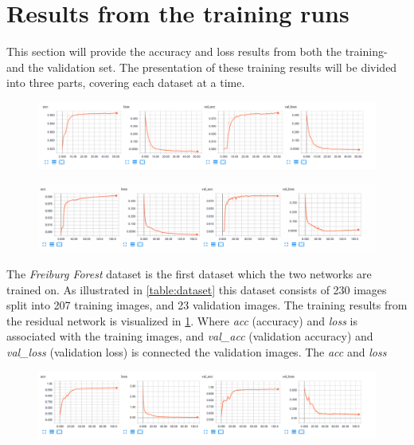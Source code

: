 \documentclass[USenglish]{ifimaster}  %
\begin{document}
\section{Results from the training runs}
This section will provide the accuracy and loss results from both the training- and the validation set. The presentation of these training results will be divided into three parts, covering each dataset at a time. 
\begin{figure}[ht]
    \centering
    \includegraphics[width=1.1\textwidth]{bilder/freiburg_residual_training_results.png}
    \label{fig:freiburg_residual_result}
\end{figure}

\begin{figure}[ht]
    \centering
    \includegraphics[width=1.1\textwidth]{bilder/freiburg_sequential_training_results.png}
    \label{fig:freiburg_sequential_result}
\end{figure}

The \textit{Freiburg Forest} dataset is the first dataset which the two networks are trained on. As illustrated in \cref{table:dataset} this dataset consists of 230 images split into 207 training images, and 23 validation images. The training results from the residual network is visualized in \cref{fig:freiburg_residual_result}. Where \textit{acc} (accuracy) and \textit{loss} is associated with the training images, and \textit{val\_acc} (validation accuracy) and \textit{val\_loss} (validation loss) is connected the validation images. The \textit{acc} and \textit{loss}  


\begin{figure}[ht]
    \centering
    \includegraphics[width=1.1\textwidth]{bilder/Custom_1_residual_training_results.png}
    \label{fig:custom_1_residual_result}
\end{figure}
\end{document}
